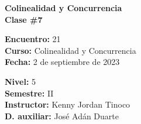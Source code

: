 \begin{center} \textbf
{
    \Large Colinealidad y Concurrencia \\ \vspace{2mm}Clase \#7
}
\end{center}

\begin{multicols}{2}
{
    \textbf{Encuentro:} 21\\
    \textbf{Curso:} Colinealidad y Concurrencia\\
    \textbf{Fecha:} 2 de septiembre de 2023\\
    \begin{flushright}
        \textbf{Nivel:} 5\\
        \textbf{Semestre:} II\\
        \textbf{Instructor:} Kenny Jordan Tinoco\\
        \textbf{D. auxiliar: }José Adán Duarte
    \end{flushright}
}
\end{multicols}

\thispagestyle{first-page-style}